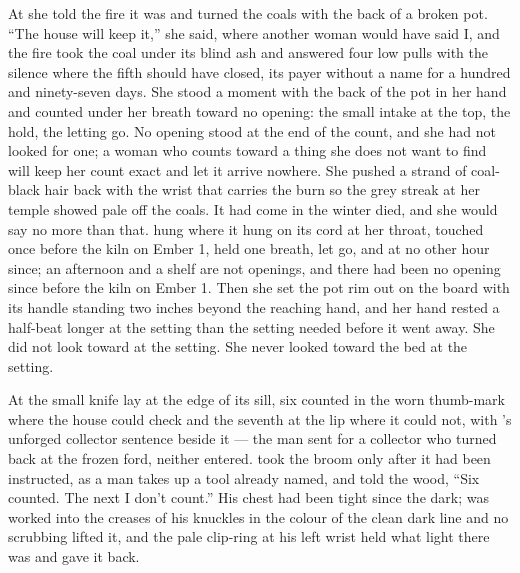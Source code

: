 At  she told the fire it was  and turned the coals with the back of a broken pot. “The house will keep it,” she said, where another woman would have said I, and the fire took the coal under its blind ash and answered four low pulls with the silence where the fifth should have closed, its payer without a name for a hundred and ninety-seven days. She stood a moment with the back of the pot in her hand and counted under her breath toward no opening: the small intake at the top, the hold, the letting go. No opening stood at the end of the count, and she had not looked for one; a woman who counts toward a thing she does not want to find will keep her count exact and let it arrive nowhere. She pushed a strand of coal-black hair back with the wrist that carries the burn so the grey streak at her temple showed pale off the coals. It had come in the winter  died, and she would say no more than that.  hung where it hung on its cord at her throat, touched once before the kiln on Ember 1, held one breath, let go, and at no other hour since; an afternoon and a shelf are not openings, and there had been no opening since before the kiln on Ember 1. Then she set the pot rim out on the board with its handle standing two inches beyond the reaching hand, and her hand rested a half-beat longer at the setting than the setting needed before it went away. She did not look toward  at the setting. She never looked toward the bed at the setting.

\scenebreak

At  the small knife lay at the edge of its sill, six counted in the worn thumb-mark where the house could check and the seventh at the lip where it could not, with 's unforged collector sentence beside it --- the man sent for a collector who turned back at the frozen ford, neither entered.  took the broom only after it had been instructed, as a man takes up a tool already named, and told the wood, “Six counted. The next I don't count.” His chest had been tight since the dark;  was worked into the creases of his knuckles in the colour of the clean dark line and no scrubbing lifted it, and the pale clip-ring at his left wrist held what light there was and gave it back.

